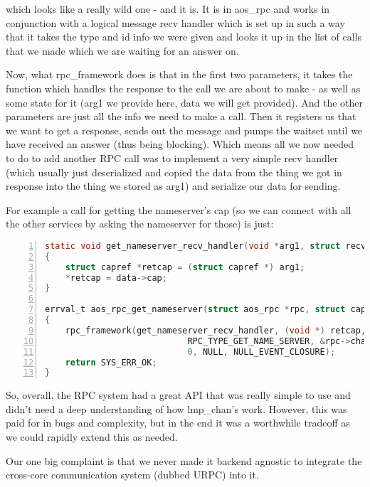 which looks like a really wild one - and it is. It is in aos\_rpc and works in conjunction with a logical message recv handler which is set up in such a way that it takes the type and id info we were given and looks it up in the list of calls that we made which we are waiting for an answer on.

Now, what rpc\_framework does is that in the first two parameters, it takes the function which handles the response to the call we are about to make - as well as some state for it (arg1 we provide here, data we will get provided). And the other parameters are just all the info we need to make a call.
Then it registers us that we want to get a response, sends out the message and pumps the waitset until we have received an answer (thus being blocking). Which means all we now needed to do to add another RPC call was to implement a very simple recv handler (which usually just deserialized and copied the data from the thing we got in response into the thing we stored as arg1) and serialize our data for sending.

For example a call for getting the nameserver's cap (so we can connect with all the other services by asking the nameserver for those) is just:

\begin{lstlisting}[caption={aos\_rpc\_get with helper function}, 
label=lst:allocation, numbers=left, stepnumber=1, float, floatplacement=tl, 
frame=tb, language=c]
static void get_nameserver_recv_handler(void *arg1, struct recv_list *data)
{
	struct capref *retcap = (struct capref *) arg1;
	*retcap = data->cap;
}

errval_t aos_rpc_get_nameserver(struct aos_rpc *rpc, struct capref *retcap)
{
	rpc_framework(get_nameserver_recv_handler, (void *) retcap,
				  			RPC_TYPE_GET_NAME_SERVER, &rpc->chan, NULL_CAP,
				  			0, NULL, NULL_EVENT_CLOSURE);
	return SYS_ERR_OK;
}
\end{lstlisting}

So, overall, the RPC system had a great API that was really simple to use and didn't need a deep understanding of how lmp\_chan's work. However, this was paid for in bugs and complexity, but in the end it was a worthwhile tradeoff as we could rapidly extend this as needed.

Our one big complaint is that we never made it backend agnostic to integrate the cross-core communication system (dubbed URPC) into it.


